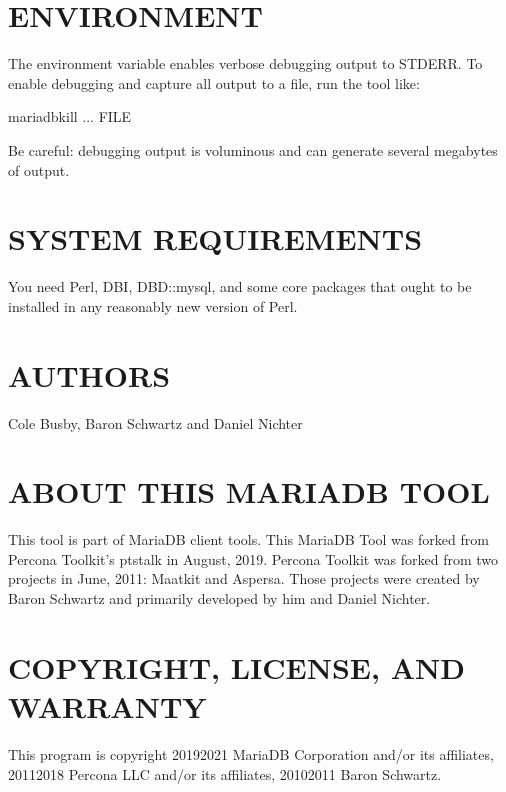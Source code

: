 \documentclass[letterpaper,10pt,english]{sphinxmanual}
\begin{document}
\section{ENVIRONMENT}
\label{\detokenize{mariadb-kill:environment}}
\sphinxAtStartPar
The environment variable  enables verbose debugging output to STDERR.
To enable debugging and capture all output to a file, run the tool like:

\begin{sphinxVerbatim}[commandchars=\\\{\}]
 mariadb\PYGZhy{}kill ... \PYGZgt{} FILE \PYGZgt{}
\end{sphinxVerbatim}

\sphinxAtStartPar
Be careful: debugging output is voluminous and can generate several megabytes
of output.


\section{SYSTEM REQUIREMENTS}
\label{\detokenize{mariadb-kill:system-requirements}}
\sphinxAtStartPar
You need Perl, DBI, DBD::mysql, and some core packages that ought to be
installed in any reasonably new version of Perl.


\section{AUTHORS}
\label{\detokenize{mariadb-kill:authors}}
\sphinxAtStartPar
Cole Busby, Baron Schwartz and Daniel Nichter


\section{ABOUT THIS MARIADB TOOL}
\label{\detokenize{mariadb-kill:about-this-mariadb-tool}}
\sphinxAtStartPar
This tool is part of MariaDB client tools. This MariaDB Tool was forked from
Percona Toolkit’s pt\sphinxhyphen{}stalk in August, 2019. Percona Toolkit was forked from two
projects in June, 2011: Maatkit and Aspersa.  Those projects were created by
Baron Schwartz and primarily developed by him and Daniel Nichter.


\section{COPYRIGHT, LICENSE, AND WARRANTY}
\label{\detokenize{mariadb-kill:copyright-license-and-warranty}}
\sphinxAtStartPar
This program is copyright 2019\sphinxhyphen{}2021 MariaDB Corporation and/or its affiliates,
2011\sphinxhyphen{}2018 Percona LLC and/or its affiliates, 2010\sphinxhyphen{}2011 Baron Schwartz.
\end{document}
